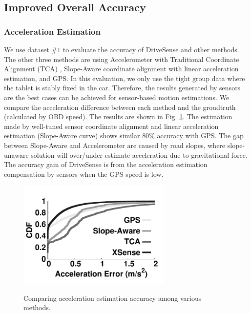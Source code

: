 \subsection{Improved Overall Accuracy}

\subsubsection{Acceleration Estimation}


We use dataset $\#1$ to evaluate the accuracy of DriveSense and
other methods. 
The other three methods are using Accelerometer with Traditional Coordinate
Alignment (TCA)  \cite{hansenspeed, wang2013sensing, chen2015invisible}, 
Slope-Aware coordinate alignment with linear 
acceleration estimation, 
and GPS.
In this evaluation, we only use the tight group data where the 
tablet is stably fixed in the car.  
Therefore, the results generated by sensors are 
the best cases can be achieved for sensor-based motion estimations. 
We compare the acceleration difference between
each method and the groudtruth (calculated by OBD speed). 
The results are shown in Fig. \ref{xsense_accuracy}. 
The estimation made by well-tuned sensor coordinate alignment and 
linear acceleration estimation (Slope-Aware curve)
shows similar $80\%$ accuracy with GPS. 
The gap between Slope-Aware and Accelerometer are caused
by road slopes, 
where slope-unaware solution will over/under-estimate 
acceleration due to gravitational force. 
The accuracy gain of DriveSense is from the 
acceleration estimation compensation by sensors
when the GPS speed is low. 

 

\begin{figure}[th]
\begin{center}
\includegraphics[width=3.0in,angle=0]{Figs/DriveSense/evaluation/xsense_accuracy.pdf}
\vspace{-0.2cm}
\caption{Comparing acceleration estimation accuracy among various methods.}
\vspace{-0.3cm}
\label{xsense_accuracy}
\end{center}
\end{figure}





